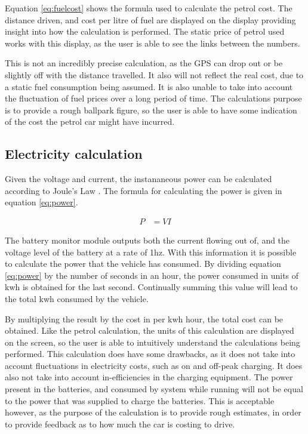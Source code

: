 Equation \ref{eq:fuelcost} shows the formula used to calculate the petrol cost. The distance driven, and cost per litre of fuel are displayed on the display providing insight into how the calculation is performed. The static price of petrol used works with this display, as the user is able to see the links between the numbers.

This is not an incredibly precise calculation, as the GPS can drop out or be slightly off with the distance travelled. It also will not reflect the real cost, due to a static fuel consumption being assumed. It is also unable to take into account the fluctuation of fuel prices over a long period of time. The calculations purpose is to provide a rough ballpark figure, so the user is able to have some indication of the cost the petrol car might have incurred.

\subsection{Electricity calculation}

Given the voltage and current, the instananeous power can be calculated according to Joule's Law \cite{joules_law}. The formula for calculating the power is given in equation \ref{eq:power}.

\begin{align}
\label{eq:power}
P &= VI
\end{align}

The battery monitor module outputs both the current flowing out of, and the voltage level of the battery at a rate of 1hz. With this information it is possible to calculate the power that the vehicle has consumed. By dividing equation \ref{eq:power} by the number of seconds in an hour, the power consumed in units of kwh is obtained for the last second. Continually summing this value will lead to the total kwh consumed by the vehicle.

By multiplying the result by the cost in per kwh hour, the total cost can be obtained. Like the petrol calculation, the units of this calculation are displayed on the screen, so the user is able to intuitively understand the calculations being performed. This calculation does have some drawbacks, as it does not take into account fluctuations in electricity costs, such as on and off-peak charging. It does also not take into account in-efficiencies in the charging equipment. The power present in the batteries, and consumed by system while running will not be equal to the power that was supplied to charge the batteries. This is acceptable however, as the purpose of the calculation is to provide rough estimates, in order to provide feedback as to how much the car is costing to drive.

